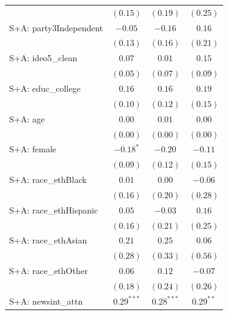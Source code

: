 \begin{tabular}{l c c c}
                                       & $(0.15)$      & $(0.19)$      & $(0.25)$      \\
S+A: party3Independent                 & $-0.05$       & $-0.16$       & $0.16$        \\
                                       & $(0.13)$      & $(0.16)$      & $(0.21)$      \\
S+A: ideo5\_clean                      & $0.07$        & $0.01$        & $0.15$        \\
                                       & $(0.05)$      & $(0.07)$      & $(0.09)$      \\
S+A: educ\_college                     & $0.16$        & $0.16$        & $0.19$        \\
                                       & $(0.10)$      & $(0.12)$      & $(0.15)$      \\
S+A: age                               & $0.00$        & $0.01$        & $0.00$        \\
                                       & $(0.00)$      & $(0.00)$      & $(0.00)$      \\
S+A: female                            & $-0.18^{*}$   & $-0.20$       & $-0.11$       \\
                                       & $(0.09)$      & $(0.12)$      & $(0.15)$      \\
S+A: race\_ethBlack                    & $0.01$        & $0.00$        & $-0.06$       \\
                                       & $(0.16)$      & $(0.20)$      & $(0.28)$      \\
S+A: race\_ethHispanic                 & $0.05$        & $-0.03$       & $0.16$        \\
                                       & $(0.16)$      & $(0.21)$      & $(0.25)$      \\
S+A: race\_ethAsian                    & $0.21$        & $0.25$        & $0.06$        \\
                                       & $(0.28)$      & $(0.33)$      & $(0.56)$      \\
S+A: race\_ethOther                    & $0.06$        & $0.12$        & $-0.07$       \\
                                       & $(0.18)$      & $(0.24)$      & $(0.26)$      \\
S+A: newsint\_attn                     & $0.29^{***}$  & $0.28^{***}$  & $0.29^{**}$   \\

\end{tabular}
